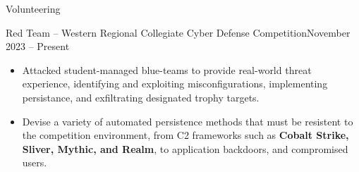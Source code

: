 \documentclass{article}
\newlength{\tabin}
\newlength{\secsep}
\newcommand{\lineunder}{\vspace*{-8pt} \\ \hspace*{-6pt} \hrulefill \\ \vspace*{-15pt}}
\newenvironment{tabbedsection}[1]{
  \begin{list}{}{
      \setlength{\itemsep}{0pt}
      \setlength{\labelsep}{0pt}
      \setlength{\labelwidth}{0pt}
      \setlength{\leftmargin}{0pt}
      \setlength{\rightmargin}{\tabin}
      \setlength{\listparindent}{0pt}
      \setlength{\parsep}{0pt}
      \setlength{\parskip}{0pt}
      \setlength{\partopsep}{0pt}
      \setlength{\topsep}{#1}
    }
  \item[]
}{\end{list}}
\newenvironment{resume_section}[1]{
  \needspace{4\baselineskip}
  \vspace{2\secsep}
  \textsc{\color{blue}\large#1}
  \lineunder
  \begin{tabbedsection}{\secsep}
}{\end{tabbedsection}}
\newenvironment{subitems}{
  \renewcommand{\labelitemi}{-}
  \begin{itemize}
      \setlength{\labelsep}{1em}
}{\end{itemize}}
\newenvironment{resume_employer_black}[3]{
  \vspace{\secsep}
  \textbf{#1} \hfill {\normalsize \textbf{(#3)}} \hspace{-5em}
  \begin{tabbedsection}{0pt}
    \ifthenelse{\isempty{#2}}%
        {}%
        {\textbf{#2}}%
}{\end{tabbedsection}}
\begin{document}
\vspace{2\secsep}

\begin{resume_section}{Volunteering}
    \begin{resume_employer_black}{Red Team -- Western Regional Collegiate Cyber Defense Competition}{}{November 2023 -- Present}
        \begin{subitems}
            \item Attacked student-managed blue-teams to provide real-world threat experience, identifying and exploiting misconfigurations, implementing persistance, and exfiltrating designated trophy targets.
            \item Devise a variety of automated persistence methods that must be resistent to the competition environment, from C2 frameworks such as \textbf{Cobalt Strike, Sliver, Mythic, and Realm}, to application backdoors, and compromised users.
        \end{subitems}
    \end{resume_employer_black}
\end{resume_section}
\end{document}
